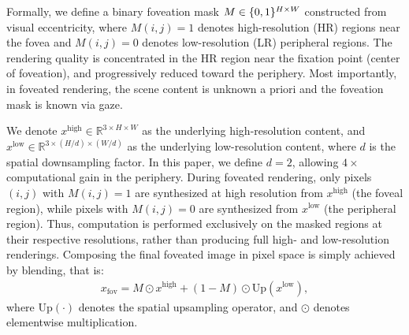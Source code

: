 Formally, we define a binary foveation mask $M \in \{0,1\}^{H \times W}$ constructed from visual eccentricity, where $M(i,j)=1$ denotes high-resolution (HR) regions near the 
fovea and $M(i,j)=0$ denotes low-resolution (LR) peripheral regions. The rendering quality is concentrated in the HR region near the fixation point (center of foveation), and progressively reduced toward the periphery. Most importantly, in foveated rendering, the scene content is unknown a priori and the foveation mask is known via gaze.

We denote $x^{\text{high}} \in \mathbb{R}^{3 \times H \times W}$ as the underlying high-resolution content, and 
$x^{\text{low}} \in \mathbb{R}^{3 \times (H/d) \times (W/d)}$ as the underlying low-resolution content, 
where $d$ is the spatial downsampling factor. In this paper, we define $d=2$, allowing $4\times$ computational gain in the periphery. During foveated rendering, only pixels $(i,j)$ with $M(i,j)=1$ are synthesized at high resolution from $x^{\text{high}}$ (the foveal region), while pixels with $M(i,j)=0$ are synthesized from $x^{\text{low}}$ (the peripheral region). Thus, computation is performed exclusively on the masked regions at their respective resolutions, rather than producing full high- and low-resolution renderings. 
Composing the final foveated image in pixel space is simply achieved by blending, that is:
\begin{align}\label{eq:fov_image_merge}
    x_{\text{fov}} 
    = M \odot x^{\text{high}}
    + (1 - M) \odot \mathrm{Up}(x^{\text{low}}),
\end{align}
where $\mathrm{Up}(\cdot)$ denotes the spatial upsampling operator, and $\odot$ denotes elementwise multiplication.


